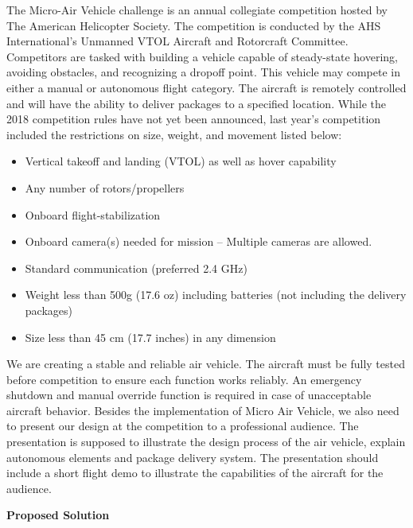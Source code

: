 \documentclass[10pt,letterpaper,onecolumn]{article}
\begin{document}
The Micro-Air Vehicle challenge is an annual collegiate competition hosted by The American Helicopter Society. The competition is conducted by the AHS International’s Unmanned VTOL Aircraft and Rotorcraft Committee. Competitors are tasked with building a vehicle capable of steady-state hovering, avoiding obstacles, and recognizing a dropoff point. This vehicle may compete in either a manual or autonomous flight category. The aircraft is remotely controlled and will have the ability to deliver packages to a specified location. While the 2018 competition rules have not yet been announced, last year’s competition included the restrictions on size, weight, and movement listed below:
\begin{itemize}
\item Vertical takeoff and landing (VTOL) as well as hover capability
\item Any number of rotors/propellers
\item Onboard flight-stabilization
\item Onboard camera(s) needed for mission – Multiple cameras are allowed.
\item Standard communication (preferred 2.4 GHz)
\item Weight less than 500g (17.6 oz) including batteries (not including the delivery packages)
\item Size less than 45 cm (17.7 inches) in any dimension
\end{itemize}

We are creating a stable and reliable air vehicle. The aircraft must be fully tested before competition to ensure each function works reliably. An emergency shutdown and manual override function is required in case of unacceptable aircraft behavior. Besides the implementation of Micro Air Vehicle, we also need to present our design at the competition to a professional audience. The presentation is supposed to illustrate the design process of the air vehicle, explain autonomous elements and package delivery system. The presentation should include a short flight demo to illustrate the capabilities of the aircraft for the audience.


\begin{center}
\large
\textbf{Proposed Solution}
\end{center}
\end{document}
